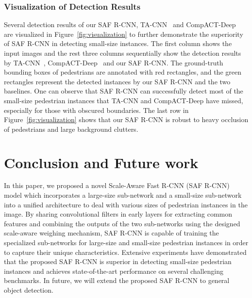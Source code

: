 \documentclass[journal]{IEEEtran}
\begin{document}
\subsubsection{Visualization of Detection Results}
Several detection results of our SAF R-CNN, TA-CNN~\cite{ta_cnn} and CompACT-Deep~\cite{compact} are visualized in Figure~\ref{fig:visualization} to further demonstrate the superiority of SAF R-CNN in detecting small-size instances. The first column shows the input images and the rest three columns sequentially show the detection results by TA-CNN~\cite{ta_cnn}, CompACT-Deep~\cite{compact} and our SAF R-CNN. The ground-truth bounding boxes of pedestrians are annotated with red rectangles, and the green rectangles represent the detected instances by our SAF R-CNN and the two baselines. One can observe that SAF R-CNN can successfully detect most of the small-size pedestrian instances that TA-CNN and CompACT-Deep have missed, especially for those with obscured boundaries. The last row in Figure~\ref{fig:visualization} shows that our SAF R-CNN is robust to heavy occlusion of pedestrians and large background clutters.

\section{Conclusion and Future work} 
In this paper, we proposed a novel Scale-Aware Fast R-CNN (SAF R-CNN) model which incorporates a large-size sub-network and a small-size sub-network into a unified architecture to deal with various sizes of pedestrian instances in the image.  By sharing convolutional filters in early layers for extracting common features and combining the outputs of the two sub-networks using the designed scale-aware weighing mechanism, SAF R-CNN is capable of training the specialized sub-networks for large-size and small-size pedestrian instances in order to capture their unique characteristics. Extensive experiments have demonstrated that the proposed SAF R-CNN is superior in detecting small-size pedestrian instances and achieves state-of-the-art performance on several challenging benchmarks. In future, we will extend the proposed SAF R-CNN to general object detection.

\vspace{-0.05in}

\scriptsize

\end{document}
